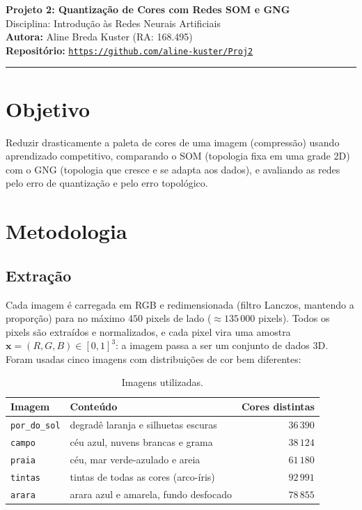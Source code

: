 \documentclass[11pt,a4paper]{article}
\begin{document}
\begin{center}
{\LARGE\bfseries Projeto 2: Quantização de Cores com Redes SOM e GNG}\\[6pt]
{\large Disciplina: Introdução às Redes Neurais Artificiais}\\[4pt]
\textbf{Autora:} Aline Breda Kuster (RA: 168.495)\\[2pt]
\textbf{Repositório:} \href{https://github.com/aline-kuster/Proj2}{\texttt{https://github.com/aline-kuster/Proj2}}
\end{center}
\vspace{-4pt}
\noindent\rule{\linewidth}{0.4pt}

\section{Objetivo}
Reduzir drasticamente a paleta de cores de uma imagem (compressão) usando aprendizado
competitivo, comparando o SOM (topologia fixa em uma grade 2D) com o GNG (topologia que cresce e
se adapta aos dados), e avaliando as redes pelo erro de quantização e pelo erro topológico.

\section{Metodologia}

\subsection{Extração}
Cada imagem é carregada em RGB e redimensionada (filtro Lanczos, mantendo a proporção) para no
máximo $450$ pixels de lado ($\approx 135\,000$ pixels). Todos os pixels são extraídos e
normalizados, e cada pixel vira uma amostra $\mathbf{x} = (R, G, B) \in [0,1]^3$: a imagem passa
a ser um conjunto de dados 3D. Foram usadas cinco imagens com distribuições de cor bem diferentes:

\begin{table}[H]
\centering\small
\begin{tabular}{llr}
\toprule
Imagem & Conteúdo & Cores distintas \\
\midrule
\texttt{por\_do\_sol} & degradê laranja e silhuetas escuras & $36\,390$ \\
\texttt{campo}        & céu azul, nuvens brancas e grama     & $38\,124$ \\
\texttt{praia}        & céu, mar verde-azulado e areia       & $61\,180$ \\
\texttt{tintas}       & tintas de todas as cores (arco-íris) & $92\,991$ \\
\texttt{arara}        & arara azul e amarela, fundo desfocado & $78\,855$ \\
\bottomrule
\end{tabular}
\caption{Imagens utilizadas.}
\end{table}
\end{document}
